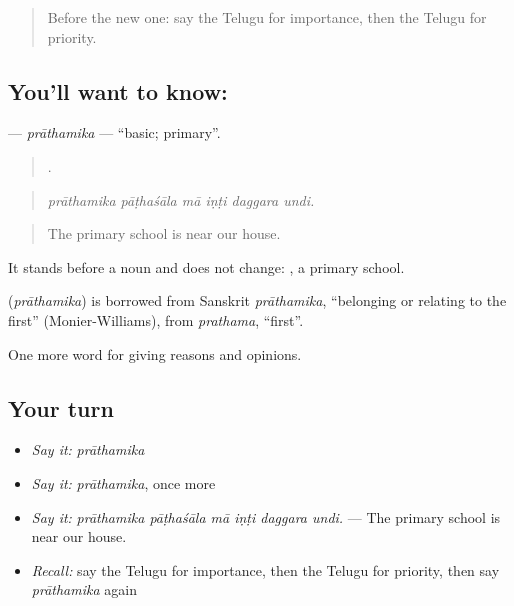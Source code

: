 \label{lesson:TE-C391-prathamika}



\begin{quote}
Before the new one: say the Telugu for importance, then the Telugu for priority.
\end{quote}

\subsection*{You'll want to know: }
\textbf{} — \emph{prāthamika} — \textquotedblleft{}basic; primary\textquotedblright{}.

\begin{quote}
     .
\end{quote}

\begin{quote}
\emph{prāthamika pāṭhaśāla mā iṇṭi daggara undi.}
\end{quote}

\begin{quote}
The primary school is near our house.
\end{quote}

It stands before a noun and does not change:  , a primary school.

\begin{cousinweb}
\textbf{} (\emph{prāthamika}) is borrowed from Sanskrit \emph{prāthamika}, \textquotedblleft{}belonging or relating to the first\textquotedblright{} (Monier-Williams), from \emph{prathama}, \textquotedblleft{}first\textquotedblright{}.
\end{cousinweb}

\begin{grammarlens}[title={What you've built}]
One more word for giving reasons and opinions.
\end{grammarlens}

\subsection*{Your turn}
\begin{itemize}
\raggedright
  \item \emph{Say it:} \emph{prāthamika}
  \item \emph{Say it:} \emph{prāthamika}, once more
  \item \emph{Say it:} \emph{prāthamika pāṭhaśāla mā iṇṭi daggara undi.} — The primary school is near our house.
  \item \emph{Recall:} say the Telugu for importance, then the Telugu for priority, then say \emph{prāthamika} again
\end{itemize}

